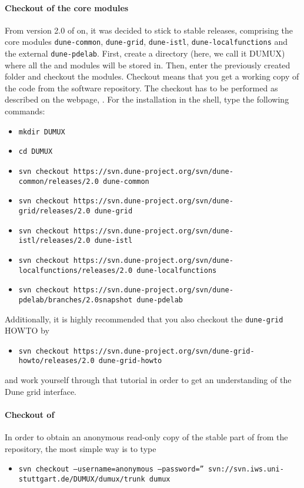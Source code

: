 \paragraph{Checkout of the core modules}
From version 2.0 of \Dune on, it was decided to stick to stable \Dune releases, comprising the core modules 
\texttt{dune-common}, \texttt{dune-grid}, \texttt{dune-istl}, \texttt{dune-localfunctions} and the external \texttt{dune-pdelab}.  
First, create a directory (here, we call it DUMUX) where all the \Dune and \Dumux modules will be stored in. Then, enter the previously created folder and checkout the modules. Checkout means that you get a working copy of the code from the software repository. 
The checkout has to be performed as described on the \Dune webpage, \cite{DUNE-HP}. For the installation in the shell, type the following commands:
\begin{itemize}
\item \texttt{mkdir DUMUX}
\item \texttt{cd DUMUX}
\item \texttt{svn checkout https://svn.dune-project.org/svn/dune-common/releases/2.0 dune-common}
\item \texttt{svn checkout https://svn.dune-project.org/svn/dune-grid/releases/2.0 dune-grid}
\item \texttt{svn checkout https://svn.dune-project.org/svn/dune-istl/releases/2.0 dune-istl}
\item \texttt{svn checkout https://svn.dune-project.org/svn/dune-localfunctions/releases/2.0 dune-localfunctions}
\item \texttt{svn checkout https://svn.dune-project.org/svn/dune-pdelab/branches/2.0snapshot dune-pdelab}
\end{itemize} 

Additionally, it is highly recommended that you also checkout the \texttt{dune-grid} HOWTO by 
\begin{itemize}
\item \texttt{svn checkout https://svn.dune-project.org/svn/dune-grid-howto/releases/2.0 dune-grid-howto}
\end{itemize}
and work yourself through that tutorial in order to get an understanding of the Dune grid interface. 

\paragraph{Checkout of \Dumux}

In order to obtain an anonymous read-only copy of the stable part of \Dumux from the repository, the most simple way is to type
\begin{itemize}
\item \texttt{svn checkout --username=anonymous --password=''
svn://svn.iws.uni-stuttgart.de/DUMUX/dumux/trunk dumux}
\end{itemize}


